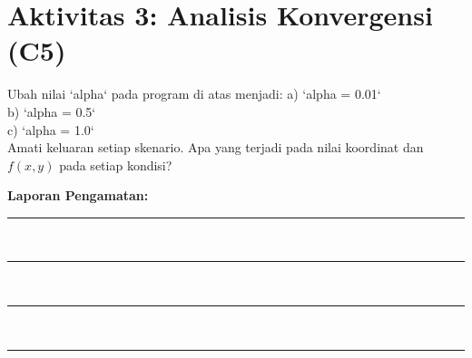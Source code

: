 \documentclass[11pt, a4paper]{article}
\begin{document}
\section*{Aktivitas 3: Analisis Konvergensi (C5)}
Ubah nilai `alpha` pada program di atas menjadi:
a) `alpha = 0.01` \\
b) `alpha = 0.5` \\
c) `alpha = 1.0` \\

Amati keluaran setiap skenario. Apa yang terjadi pada nilai koordinat dan $f(x,y)$ pada setiap kondisi?

\vspace{1cm}
\textbf{Laporan Pengamatan:} \\
\rule{\textwidth}{0.4pt} \\
\rule{\textwidth}{0.4pt} \\
\rule{\textwidth}{0.4pt} \\
\rule{\textwidth}{0.4pt}
\end{document}
